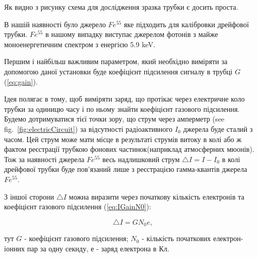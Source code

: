 \documentclass[pdftex,14pt]{scrartcl}
\begin{document}
	
	
	
	Як видно з рисунку схема для дослідження зразка трубки є досить проста.
	
	В нашій наявності було джерело $Fe^{55}$  яке підходить для калібровки дрейфової трубки. $Fe^{55}$ в нашому випадку виступає джерелом фотонів з майже моноенергетичним спектром з енергією 5.9 keV.
	
	Першим і найбільш важливим параметром, який необхідно виміряти за допомогою даної установки буде коефіцієнт підсилення сигналу в трубці $G$ (\ref{eq:gain}).
	
	Ідея полягає в тому, щоб виміряти заряд, що протікає через електричне коло трубки за одиницю часу і по ньому знайти коефіцієнт газового підсилення. Будемо дотримуватися тієї точки зору, що струм через амперметр  (see fig.~\ref{fig:electricCircuit}) за відсутності радіоактивного $I_0$ джерела буде сталий з часом. Цей струм може мати місце в результаті струмів витоку в колі або ж фактом реєстрації трубкою фонових частинок(наприклад атмосферних мюонів). Тож за наявності джерела $Fe^{55}$ весь надлишковий струм $\bigtriangleup I = I-I_0$ в колі  дрейфової трубки буде пов’язаний лише з реєстрацією гамма-квантів джерела $Fe^{55}$.
	
	З іншої сторони $\bigtriangleup I$  можна виразити через початкову кількість електронів та коефіцієнт газового підсилення (\ref{eq:IGainN0}):
	
	\begin{equation}
	\bigtriangleup I = G N_0 e,
	\label{eq:IGainN0}
	\end{equation}
	
	
	тут $G$ - коефіцієнт газового підсилення; $N_0$ - кількість початкових електрон-іонних пар за одну секнду, е - заряд електрона в Кл.
	
\end{document}
